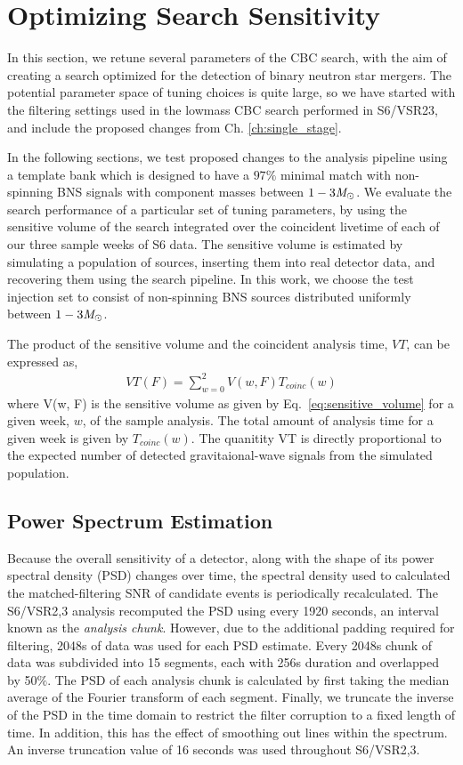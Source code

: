 \section{Optimizing Search Sensitivity}
\label{sec:tuning}

In this section, we retune several parameters of the CBC search, with the aim of creating a search optimized for the detection of binary neutron star mergers. The potential parameter space of tuning choices is quite large, so we have started with the filtering settings used in the lowmass CBC search performed in S6/VSR23, and include the proposed changes from Ch. \ref{ch:single_stage}. 

In the following sections, we test proposed changes to the analysis pipeline using a template bank which is designed to have a $97\%$ minimal match with non-spinning BNS signals with component masses between $1-3 \mathit{M}_\odot$. We evaluate the search performance of a particular set of tuning parameters, by using the  sensitive volume of the search integrated over the coincident livetime of each of our three sample weeks of S6 data. The sensitive volume is estimated by simulating a population of sources, inserting them into real detector data, and recovering them using the search pipeline. In this work, we choose the test injection set to consist of non-spinning BNS sources distributed uniformly between $1-3 \mathit{M}_\odot$.

The product of the sensitive volume and the coincident analysis time, $VT$, can be expressed as,
%
\begin{eqnarray}
VT (F) = \sum_{w=0}^2 V(w, F) T_{coinc}(w)
\end{eqnarray}
%
where V(w, F) is the sensitive volume as given by Eq.~\eqref{eq:sensitive_volume} for a given week, $w$, of the sample analysis. The total amount of analysis time for a given week is given by $T_{coinc}(w)$. The quanitity VT is directly proportional to the expected number of detected gravitaional-wave signals from the simulated population. 

\subsection{Power Spectrum Estimation}
\label{sec:psd}

Because the overall sensitivity of a detector, along with the shape of its power spectral density (PSD) changes over time, the spectral density used to calculated the matched-filtering SNR of candidate events is periodically recalculated. The S6/VSR2,3 analysis recomputed the PSD using every 1920 seconds, an interval known as the \emph{analysis chunk}. However, due to the additional padding required for filtering, 2048s of data was used for each PSD estimate. Every 2048s chunk of data was subdivided into 15 segments, each with 256s duration and overlapped by 50$\%$. The PSD of each analysis chunk is calculated by first taking the median average of the Fourier transform of each segment. Finally, we truncate the inverse of the PSD in the time domain to restrict the filter corruption to a fixed length of time. In addition, this has the effect of smoothing out lines within the spectrum. An inverse truncation value of 16 seconds was used throughout S6/VSR2,3. 

